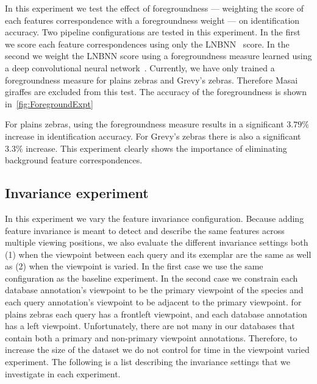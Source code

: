         In this experiment we test the effect of foregroundness ---
          weighting the score of each features correspondence with a
          foregroundness weight --- on identification accuracy.
        Two pipeline configurations are tested in this experiment.
        In the first we score each feature correspondences using only
          the LNBNN~\cite{mccann_local_2012} score.
        In the second we weight the LNBNN score using a foregroundness
          measure learned using a deep convolutional neural
          network~\cite{parham_photographic_2015}.
        Currently, we have only trained a foregroundness measure for
          plains zebras and Grevy's zebras.
        Therefore Masai giraffes are excluded from this test.
        The accuracy of the foregroundness is shown
          in~\cref{fig:ForegroundExpt}

        For plains zebras, using the foregroundness measure results in
          a significant $3.79\percent$ increase in identification
          accuracy.
        For Grevy's zebras there is also a significant  $3.3\percent$
          increase.
        This experiment clearly shows the importance of eliminating
          background feature correspondences.
     
    \subsection{Invariance experiment}\label{sub:exptinvar}  
        In this experiment we vary the feature invariance
          configuration.
        Because adding feature invariance is meant to detect and
          describe the same features across multiple viewing positions,
          we also evaluate the different invariance settings both
        (1) when the viewpoint between each query and its \groundtrue{}
          exemplar are the same as well as
        (2) when the viewpoint is varied.
        In the first case we use the same \timectrl{} configuration as
          the baseline experiment.
        In the second case we constrain each database annotation's
          viewpoint to be the primary viewpoint of the species and each
          query annotation's viewpoint to be adjacent to the primary
          viewpoint.
        \Eg{} for plains zebras each query has a frontleft viewpoint,
          and each database annotation has a left viewpoint.
        Unfortunately, there are not many \names{} in our databases
          that contain both a primary and non-primary viewpoint
          annotations.
        Therefore, to increase the size of the dataset we do not
          control for time in the viewpoint varied experiment.
        The following is a list describing the invariance settings that
          we investigate in each experiment.

